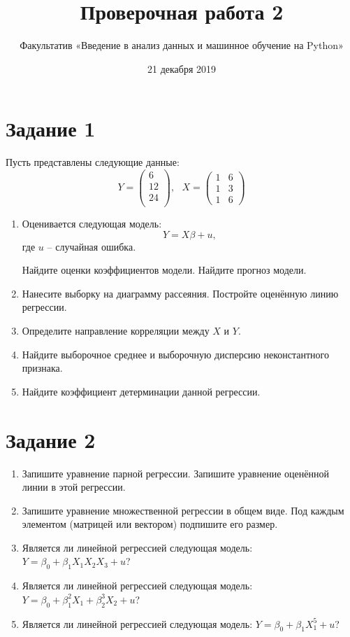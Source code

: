 \documentclass[11pt, a4paper]{extarticle}
\title{Проверочная работа 2}
\author{Факультатив «Введение в анализ данных и машинное обучение на Python»}
\date{21 декабря 2019}
\begin{document}
	
	\maketitle
	
	\section*{Задание 1} 
	
	Пусть представлены следующие данные:
	\[
	Y = \begin{pmatrix}
	6 \\
	12 \\
	24 \\
	\end{pmatrix}, \text{ } X = \begin{pmatrix}
	1 & 6 \\
	1 & 3 \\
	1 & 6
	\end{pmatrix}
	\]
	\begin{enumerate}[label=\alph*)]
		\item Оценивается следующая модель:
		\[Y = X\beta + u,\]
		где $u$ – случайная ошибка.
		
		Найдите оценки коэффициентов модели. Найдите прогноз модели.
		\item Нанесите выборку на диаграмму рассеяния. Постройте оценённую линию регрессии. 
		\item Определите направление корреляции между $X$ и $Y$.
		\item Найдите выборочное среднее и выборочную дисперсию неконстантного признака.  
		\item Найдите коэффициент детерминации данной регрессии. 
	\end{enumerate}

	\section*{Задание 2}
	\begin{enumerate}[label=\alph*)]
		\item Запишите уравнение парной регрессии. Запишите уравнение оценённой линии в этой регрессии. 
		\item Запишите уравнение множественной регрессии в общем виде. Под каждым элементом (матрицей или вектором) подпишите его размер.
		\item Является ли линейной регрессией следующая модель:
		$Y = \beta_0 + \beta_1X_1X_2X_3 + u$?
		\item Является ли линейной регрессией следующая модель:
		$Y = \beta_0 + \beta_1^2X_1 + \beta_2^3X_2 + u$?
		\item Является ли линейной регрессией следующая модель:
		$Y = \beta_0 + \beta_1X_1^5 + u$?
	\end{enumerate}
	
\end{document}

